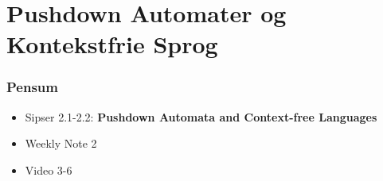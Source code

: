 \section{Pushdown Automater og Kontekstfrie Sprog}%
\label{sec:pdacfg}

\begin{frame}
  \frametitle{Pensum}
  \begin{itemize}
    \item Sipser 2.1-2.2: \textbf{Pushdown Automata and Context-free Languages}
    \item Weekly Note 2
    \item Video 3-6
  \end{itemize}
\end{frame}



